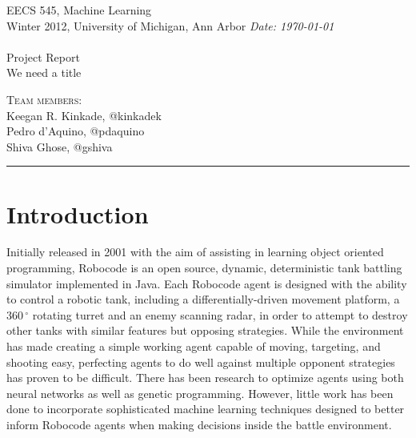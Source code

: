 \documentclass{article}
\newcommand{\shortbar}{\begin{center}\rule{5ex}{0.1pt}\end{center}}
\newcommand{\courseNumber}{EECS 545}
\newcommand{\courseTitle}{Machine Learning}
\newcommand{\semester}{Winter 2012}
\theoremstyle{plain}
\theoremstyle{definition}
\theoremstyle{remark}
\newenvironment{solution}[1]{\medskip\noindent{\bf Problem #1.~}}{\shortbar}
\newcommand{\solutions}[4]{
\vspace{-2ex}
\begin{center}
{\small  \courseNumber, \courseTitle
\hfill {\Large \bf {#1} }\\
\semester, University of Michigan, Ann Arbor \hfill
{\em Date: #3}}\\
\vspace{-1ex}
\hrulefill\\
\vspace{4ex}
{\normalsize Project Report}\\
{\LARGE  #2}\\
\vspace{2ex}
\end{center}
\begin{trivlist}
\item \textsc{Team members:} {#4}
\end{trivlist}
\noindent
\vspace{-1cm}
\shortbar
\vspace{-0.5cm}
}
\begin{document}
\solutions{}{We need a title}{\today}{\\ Keegan R. Kinkade, @kinkadek\\ Pedro d'Aquino, @pdaquino \\Shiva Ghose, @gshiva }
%
%

\begin{abstract}

Robocode\cite{robocode} is a battle-tank simulator, for which players write robots in Java that compete among each other. Traditionally, most robots have been hand-coded. In this project, we create a robot that uses machine learning techniques to decide which actions to take. In particular, we use support vector machines to learn evasion and targeting strategies, with competitive results. We also implement Q-learning to learn targeting strategies, but with less success. We test our robot against some of the best Robocode robots available.
\end{abstract}

\section{Introduction}

Initially released in 2001 with the aim of assisting in learning object oriented programming, Robocode is an open source, dynamic, deterministic tank battling simulator implemented in Java. Each Robocode agent is designed with the ability to control a robotic tank, including a differentially-driven movement platform, a $360\,^{\circ}\mathrm{}$ rotating turret and an enemy scanning radar, in order to attempt to destroy other tanks with similar features but opposing strategies. While the environment has made creating a simple working agent capable of moving, targeting, and shooting easy, perfecting agents to do well against multiple opponent strategies has proven to be difficult. There has been research to optimize agents using both neural networks as well as genetic programming. However, little work has been done to incorporate sophisticated machine learning techniques designed to better inform Robocode agents when making decisions inside the battle environment.
\end{document}
